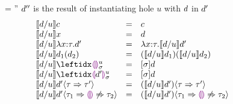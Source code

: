 \begin{figure}[t]
\judgbox
  { = \dexp''}
  {$d''$ is the result of instantiating hole $u$ with $d$ in $d'$}
\[
\begin{array}{lcll}
\instantiate{\dexp}{u}{c}
&=&
c\\
{\instantiate{\dexp}{u}{x}}
&=&
\dexp\\
{\instantiate{\dexp}{u}{\halam{x}{\htau}{\dexp'}}}
&=&
{\halam{x}{\htau}{\instantiate{\dexp}{u}{\dexp'}}}\\
{\instantiate{\dexp}{u}{\dap{d_1}{d_2}}}
&=&
{\dapP{\instantiate{\dexp}{u}{d_1}}{\instantiate{\dexp}{u}{d_2}}}
\\
\instantiate{\dexp}{u}{\dehole{u}{\subst}{}}
&=&
[\subst]\dexp
\\
\instantiate{\dexp}{u}{\dhole{\dexp'}{u}{\subst}{}}
&=&
[\subst]\dexp
\\
\instantiate{\dexp}{u}{\dcasttwo{\dexp'}{\htau}{\htau'}}
&=&
\dcasttwo{(\instantiate{\dexp}{u}{\dexp'})}{\htau}{\htau'}
\\
\instantiate{\dexp}{u}{\dcastfail{\dexp'}{\htau_1}{\htau_2}}
&=&
\dcastfail{(\instantiate{\dexp}{u}{\dexp'})}{\htau_1}{\htau_2}
\end{array}
\]
\end{figure}
